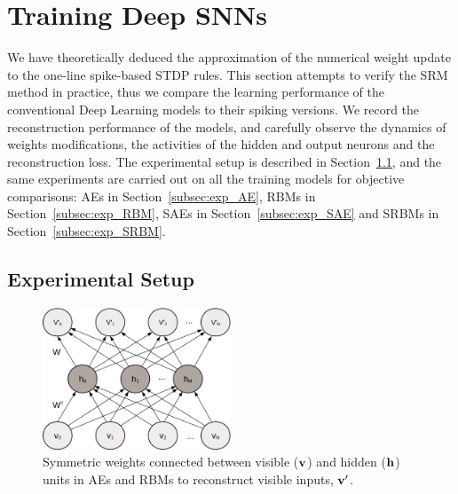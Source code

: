 \section{Training Deep SNNs}
\label{sec:dSNN}
We have theoretically deduced the approximation of the numerical weight update to the one-line spike-based STDP rules.
This section attempts to verify the SRM method in practice, thus we compare the learning performance of the conventional Deep Learning models to their spiking versions.
We record  the reconstruction performance of the models, and carefully observe the dynamics of weights modifications, the activities of the hidden and output neurons and the reconstruction loss.
The experimental setup is described in Section~\ref{subsec:SNN_setup}, and the same experiments are carried out on all the training models for objective comparisons: AEs in Section~\ref{subsec:exp_AE}, RBMs in Section~\ref{subsec:exp_RBM}, SAEs in Section~\ref{subsec:exp_SAE} and SRBMs in Section~\ref{subsec:exp_SRBM}.

\subsection{Experimental Setup}
\label{subsec:SNN_setup}
\begin{figure}
	\centering
	\includegraphics[width=0.5\textwidth]{pics_sdlm/AE.png}
	\caption[Reconstruction using AEs and RBMs.]{Symmetric weights connected between visible ($\bf{v}$) and hidden ($\bf{h}$) units in AEs and RBMs to reconstruct visible inputs, $\bf{v'}$.}
	\label{fig:sym_conn}
\end{figure}

